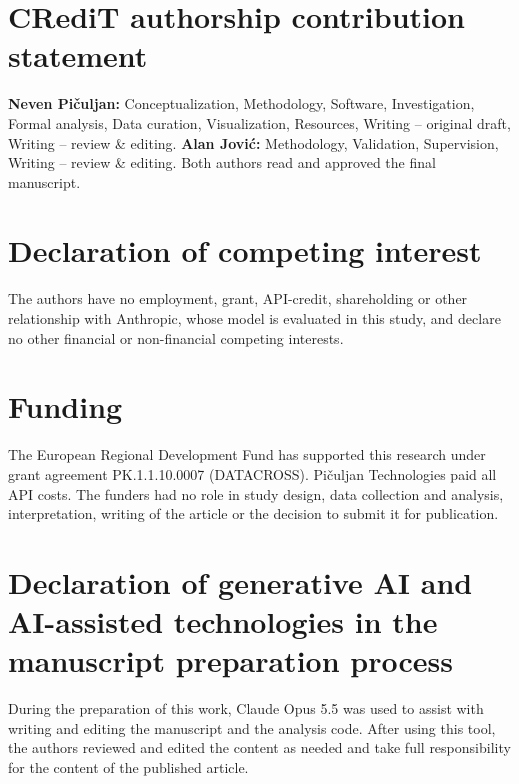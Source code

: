 
\section*{CRediT authorship contribution statement}
\textbf{Neven Pi\v{c}uljan:} Conceptualization, Methodology, Software, Investigation, Formal analysis, Data curation,
Visualization, Resources, Writing -- original draft, Writing -- review \& editing. \textbf{Alan Jovi\'c:} Methodology,
Validation, Supervision, Writing -- review \& editing. Both authors read and approved the final manuscript.

\section*{Declaration of competing interest}
The authors have no employment, grant, API-credit, shareholding or other relationship with Anthropic, whose model is
evaluated in this study, and declare no other financial or non-financial competing interests.

\section*{Funding}
The European Regional Development Fund has supported this research under grant agreement PK.1.1.10.0007 (DATACROSS).
Pi\v{c}uljan Technologies paid all API costs. The funders had no role in study design, data collection and analysis,
interpretation, writing of the article or the decision to submit it for publication.

\section*{Declaration of generative AI and AI-assisted technologies in the manuscript preparation process}
During the preparation of this work, Claude Opus 5.5 was used to assist with writing and editing the manuscript and
the analysis code. After using this tool, the authors reviewed and edited the content as needed and take full
responsibility for the content of the published article.
